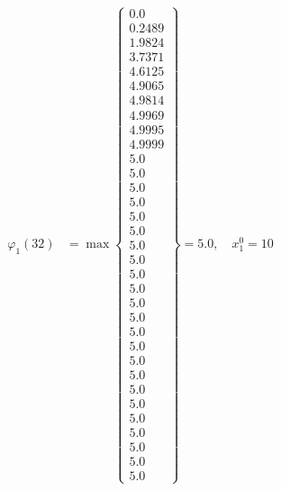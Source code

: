 \documentclass{article}
\begin{document}
\begin{align*}
  
\varphi_{1}(32) &= \max \left\{ \begin{array}{c}
0.0 \\
 0.2489 \\
 1.9824 \\
 3.7371 \\
 4.6125 \\
 4.9065 \\
 4.9814 \\
 4.9969 \\
 4.9995 \\
 4.9999 \\
 5.0 \\
 5.0 \\
 5.0 \\
 5.0 \\
 5.0 \\
 5.0 \\
 5.0 \\
 5.0 \\
 5.0 \\
 5.0 \\
 5.0 \\
 5.0 \\
 5.0 \\
 5.0 \\
 5.0 \\
 5.0 \\
 5.0 \\
 5.0 \\
 5.0 \\
 5.0 \\
 5.0 \\
 5.0 \\
 5.0
\end{array} \right\}=5.0,\quad x_{1}^0=10\\
  
  
  

\end{align*}
\end{document}
